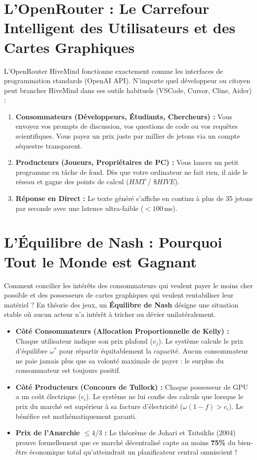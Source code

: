 \documentclass[11pt,a4paper]{report}
\begin{document}
\section{L'OpenRouter : Le Carrefour Intelligent des Utilisateurs et des Cartes Graphiques}

L'OpenRouter HiveMind fonctionne exactement comme les interfaces de programmation standards (OpenAI API). N'importe quel développeur ou citoyen peut brancher HiveMind dans ses outils habituels (VSCode, Cursor, Cline, Aider) :

\begin{enumerate}[leftmargin=1.8em]
    \item \textbf{Consommateurs (Développeurs, Étudiants, Chercheurs) :} Vous envoyez vos prompts de discussion, vos questions de code ou vos requêtes scientifiques. Vous payez un prix juste par millier de jetons via un compte séquestre transparent.
    \item \textbf{Producteurs (Joueurs, Propriétaires de PC) :} Vous lancez un petit programme en tâche de fond. Dès que votre ordinateur ne fait rien, il aide le réseau et gagne des points de calcul ($HMT$ / $\$HIVE$).
    \item \textbf{Réponse en Direct :} Le texte généré s'affiche en continu à plus de 35 jetons par seconde avec une latence ultra-faible ($< 100$\,ms).
\end{enumerate}

\section{L'Équilibre de Nash : Pourquoi Tout le Monde est Gagnant}

Comment concilier les intérêts des consommateurs qui veulent payer le moins cher possible et des possesseurs de cartes graphiques qui veulent rentabiliser leur matériel ? En théorie des jeux, un \textbf{Équilibre de Nash} désigne une situation stable où aucun acteur n'a intérêt à tricher ou dévier unilatéralement.

\begin{itemize}[leftmargin=1.8em]
    \item \textbf{Côté Consommateurs (Allocation Proportionnelle de Kelly) :} Chaque utilisateur indique son prix plafond ($v_j$). Le système calcule le prix d'équilibre $\omega^*$ pour répartir équitablement la capacité. Aucun consommateur ne paie jamais plus que sa volonté maximale de payer : le surplus du consommateur est toujours positif.
    \item \textbf{Côté Producteurs (Concours de Tullock) :} Chaque possesseur de GPU a un coût électrique ($c_i$). Le système ne lui confie des calculs que lorsque le prix du marché est supérieur à sa facture d'électricité ($\omega(1-f) > c_i$). Le bénéfice est mathématiquement garanti.
    \item \textbf{Prix de l'Anarchie $\le 4/3$ :} Le théorème de Johari et Tsitsiklis (2004) prouve formellement que ce marché décentralisé capte au moins \textbf{75\%} du bien-être économique total qu'atteindrait un planificateur central omniscient !
\end{itemize}
\end{document}

